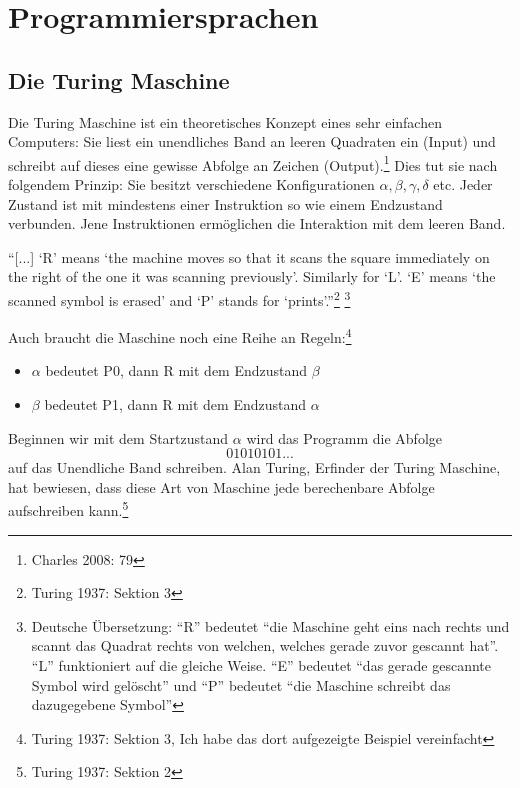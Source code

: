 \documentclass[10pt,a4paper]{article}
\begin{document}
\section{Programmiersprachen}
\subsection{Die Turing Maschine}
Die Turing Maschine ist ein theoretisches Konzept eines sehr einfachen Computers: Sie liest ein unendliches Band an leeren Quadraten ein (Input) und schreibt auf dieses eine gewisse Abfolge an Zeichen (Output).\footnote{Charles 2008: 79} Dies tut sie nach folgendem Prinzip: Sie besitzt verschiedene Konfigurationen $\alpha, \beta, \gamma, \delta$ etc. Jeder Zustand ist mit mindestens einer Instruktion so wie einem Endzustand verbunden. Jene Instruktionen ermöglichen die Interaktion mit dem leeren Band. 
\begin{displayquote}
\enquote{[...] \enquote{R} means \enquote{the machine moves
so that it scans the square immediately on the right of the one it was
scanning previously}. Similarly for \enquote{L}. \enquote{E} means \enquote{the scanned
symbol is erased} and \enquote{P} stands for \enquote{prints}.}\footnote{Turing 1937: Sektion 3} \footnote{Deutsche Übersetzung: \enquote{R} bedeutet \enquote{die Maschine geht eins nach rechts und scannt das Quadrat rechts von welchen, welches gerade zuvor gescannt hat}. \enquote{L} funktioniert auf die gleiche Weise. \enquote{E} bedeutet \enquote{das gerade gescannte Symbol wird gelöscht} und \enquote{P} bedeutet \enquote{die Maschine schreibt das dazugegebene Symbol}}
\end{displayquote}
Auch braucht die Maschine noch eine Reihe an Regeln:\footnote{Turing 1937: Sektion 3, Ich habe das dort aufgezeigte Beispiel vereinfacht}
\begin{itemize}
    \item $\alpha$ bedeutet P0, dann R mit dem Endzustand $\beta$
    \item $\beta$ bedeutet P1, dann R mit dem Endzustand $\alpha$
\end{itemize}
Beginnen wir mit dem Startzustand $\alpha$ wird das Programm die Abfolge $$01010101...$$ auf das Unendliche Band schreiben. Alan Turing, Erfinder der Turing Maschine, hat bewiesen, dass diese Art von Maschine jede berechenbare Abfolge aufschreiben kann.\footnote{Turing 1937: Sektion 2}
\end{document}
